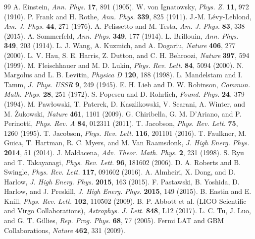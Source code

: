 \documentclass[11pt,a4paper]{article}
\begin{document}
\begin{thebibliography}{99}
 A. Einstein, \emph{Ann. Phys.} \textbf{17}, 891 (1905).
 W. von Ignatowsky, \emph{Phys. Z.} \textbf{11}, 972 (1910).
 P. Frank and H. Rothe, \emph{Ann. Phys.} \textbf{339}, 825 (1911).
 J.-M. L\'evy-Leblond, \emph{Am. J. Phys.} \textbf{44}, 271 (1976).
 A. Pelissetto and M. Testa, \emph{Am. J. Phys.} \textbf{83}, 338 (2015).
 A. Sommerfeld, \emph{Ann. Phys.} \textbf{349}, 177 (1914).
 L. Brillouin, \emph{Ann. Phys.} \textbf{349}, 203 (1914).
 L. J. Wang, A. Kuzmich, and A. Dogariu, \emph{Nature} \textbf{406}, 277 (2000).
 L. V. Hau, S. E. Harris, Z. Dutton, and C. H. Behroozi, \emph{Nature} \textbf{397}, 594 (1999).
 M. Fleischhauer and M. D. Lukin, \emph{Phys. Rev. Lett.} \textbf{84}, 5094 (2000).
 N. Margolus and L. B. Levitin, \emph{Physica D} \textbf{120}, 188 (1998).
 L. Mandelstam and I. Tamm, \emph{J. Phys. USSR} \textbf{9}, 249 (1945).
 E. H. Lieb and D. W. Robinson, \emph{Commun. Math. Phys.} \textbf{28}, 251 (1972).
 S. Popescu and D. Rohrlich, \emph{Found. Phys.} \textbf{24}, 379 (1994).
 M. Paw{\l}owski, T. Paterek, D. Kaszlikowski, V. Scarani, A. Winter, and M. {\.Z}ukowski, \emph{Nature} \textbf{461}, 1101 (2009).
 G. Chiribella, G. M. D'Ariano, and P. Perinotti, \emph{Phys. Rev. A} \textbf{84}, 012311 (2011).
 T. Jacobson, \emph{Phys. Rev. Lett.} \textbf{75}, 1260 (1995).
 T. Jacobson, \emph{Phys. Rev. Lett.} \textbf{116}, 201101 (2016).
 T. Faulkner, M. Guica, T. Hartman, R. C. Myers, and M. Van Raamsdonk, \emph{J. High Energ. Phys.} \textbf{2014}, 51 (2014).
 J. Maldacena, \emph{Adv. Theor. Math. Phys.} \textbf{2}, 231 (1998).
 S. Ryu and T. Takayanagi, \emph{Phys. Rev. Lett.} \textbf{96}, 181602 (2006).
 D. A. Roberts and B. Swingle, \emph{Phys. Rev. Lett.} \textbf{117}, 091602 (2016).
 A. Almheiri, X. Dong, and D. Harlow, \emph{J. High Energ. Phys.} \textbf{2015}, 163 (2015).
 F. Pastawski, B. Yoshida, D. Harlow, and J. Preskill, \emph{J. High Energ. Phys.} \textbf{2015}, 149 (2015).
 B. Eastin and E. Knill, \emph{Phys. Rev. Lett.} \textbf{102}, 110502 (2009).
 B. P. Abbott et al. (LIGO Scientific and Virgo Collaborations), \emph{Astrophys. J. Lett.} \textbf{848}, L12 (2017).
 L. C. Tu, J. Luo, and G. T. Gillies, \emph{Rep. Prog. Phys.} \textbf{68}, 77 (2005).
 Fermi LAT and GBM Collaborations, \emph{Nature} \textbf{462}, 331 (2009).
\end{thebibliography}
\end{document}
